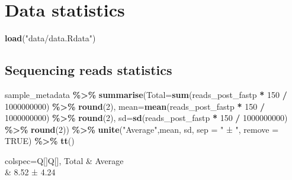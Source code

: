 \documentclass[
]{book}
\newenvironment{Shaded}{\begin{snugshade}}{\end{snugshade}}
\newcommand{\AttributeTok}[1]{\textcolor[rgb]{0.13,0.29,0.53}{#1}}
\newcommand{\ConstantTok}[1]{\textcolor[rgb]{0.56,0.35,0.01}{#1}}
\newcommand{\DecValTok}[1]{\textcolor[rgb]{0.00,0.00,0.81}{#1}}
\newcommand{\FunctionTok}[1]{\textcolor[rgb]{0.13,0.29,0.53}{\textbf{#1}}}
\newcommand{\NormalTok}[1]{#1}
\newcommand{\SpecialCharTok}[1]{\textcolor[rgb]{0.81,0.36,0.00}{\textbf{#1}}}
\newcommand{\StringTok}[1]{\textcolor[rgb]{0.31,0.60,0.02}{#1}}
\begin{document}
\chapter{Data statistics}\label{data-statistics}

\begin{Shaded}
\begin{Highlighting}[]
\FunctionTok{load}\NormalTok{(}\StringTok{"data/data.Rdata"}\NormalTok{)}
\end{Highlighting}
\end{Shaded}

\section{Sequencing reads statistics}\label{sequencing-reads-statistics}

\begin{Shaded}
\begin{Highlighting}[]
\NormalTok{sample\_metadata }\SpecialCharTok{\%\textgreater{}\%} 
    \FunctionTok{summarise}\NormalTok{(}\AttributeTok{Total=}\FunctionTok{sum}\NormalTok{(reads\_post\_fastp }\SpecialCharTok{*} \DecValTok{150} \SpecialCharTok{/} \DecValTok{1000000000}\NormalTok{) }\SpecialCharTok{\%\textgreater{}\%} \FunctionTok{round}\NormalTok{(}\DecValTok{2}\NormalTok{), }
              \AttributeTok{mean=}\FunctionTok{mean}\NormalTok{(reads\_post\_fastp }\SpecialCharTok{*} \DecValTok{150} \SpecialCharTok{/} \DecValTok{1000000000}\NormalTok{) }\SpecialCharTok{\%\textgreater{}\%} \FunctionTok{round}\NormalTok{(}\DecValTok{2}\NormalTok{),}
              \AttributeTok{sd=}\FunctionTok{sd}\NormalTok{(reads\_post\_fastp }\SpecialCharTok{*} \DecValTok{150} \SpecialCharTok{/} \DecValTok{1000000000}\NormalTok{) }\SpecialCharTok{\%\textgreater{}\%} \FunctionTok{round}\NormalTok{(}\DecValTok{2}\NormalTok{)) }\SpecialCharTok{\%\textgreater{}\%}
    \FunctionTok{unite}\NormalTok{(}\StringTok{"Average"}\NormalTok{,mean, sd, }\AttributeTok{sep =} \StringTok{" ± "}\NormalTok{, }\AttributeTok{remove =} \ConstantTok{TRUE}\NormalTok{) }\SpecialCharTok{\%\textgreater{}\%}
    \FunctionTok{tt}\NormalTok{()}
\end{Highlighting}
\end{Shaded}

\begin{table}
\centering
\begin{tblr}[         %
]                     %
{                     %
colspec={Q[]Q[]},
}                     %
\toprule
Total & Average \\  & 8.52 ± 4.24 \\
\bottomrule
\end{tblr}
\end{table}
\end{document}
